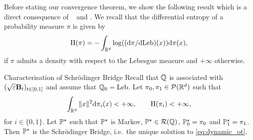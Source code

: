 \documentclass{article}
\begin{document}
Before stating our convergence theorem, we show the following result which is a direct consequence of ~\citep[Theorem 2.12]{leonard2014survey} and \citep[Theorem 2.14]{leonard2014reciprocal}. We recall that the differential entropy of a probability measure $\pi$ is given by 
\begin{equation}
     \mathrm{H}(\pi) =- \int_{\mathbb{R}^d} \log((\mathrm{d} \pi / \mathrm{d} \mathrm{Leb})(x)) \mathrm{d} \pi(x) ,
\end{equation}
if $\pi$ admits a density with respect to the Lebesgue measure and $+\infty$ otherwise. 

\begin{lemma}{Characterisation of Schr\"odinger Bridge}{}
\label{lemma:sb_characterisation}
Recall that $\mathbb{Q}$ is associated with $(\sqrt{\varepsilon} \mathbf{B}_t)_{t \in [0,1]}$ and assume that $\mathbb{Q}_0 = \mathrm{Leb}$. Let $\pi_0, \pi_1 \in \mathcal{P}(\mathbb{R}^d)$ such that 
\begin{equation}
     \int_{\mathbb{R}^d} \| x \|^2 \mathrm{d} \pi_i(x) < +\infty  , \qquad \mathrm{H}(\pi_i) < +\infty ,
\end{equation}
for $i \in \{0, 1\}$. Let $\mathbb{P}^\star$ such that $\mathbb{P}^\star$ is Markov, $\mathbb{P}^\star \in \mathcal{R}(\mathbb{Q})$, $\mathbb{P}^\star_0 = \pi_0$ and $\mathbb{P}^\star_1 = \pi_1$. Then $\mathbb{P}^\star$ is the Schr\"odinger Bridge, i.e.~the unique solution to  \eqref{eq:dynamic_ot}.
\end{lemma}
\end{document}
